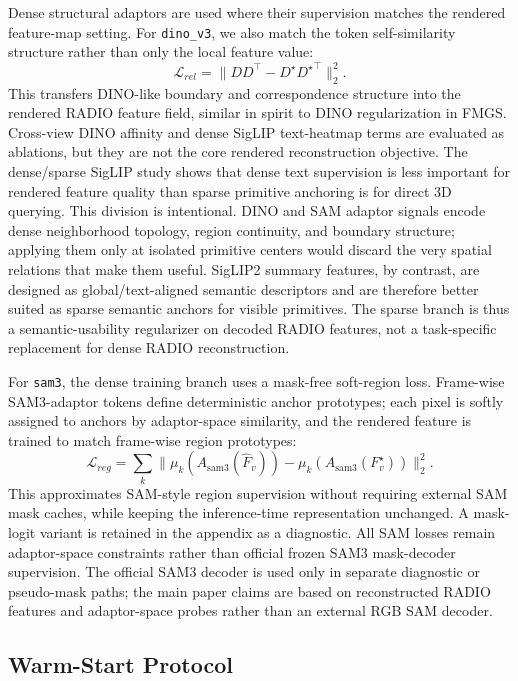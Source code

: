 \documentclass[journal,twoside]{IEEEtran}
\begin{document}
Dense structural adaptors are used where their supervision matches the rendered
feature-map setting. For \texttt{dino\_v3}, we also match the token
self-similarity structure rather than only the local feature value:
\begin{equation}
  \mathcal{L}_{rel}
  =
  \|DD^\top - D^{\star}{D^{\star}}^\top\|_2^2.
\end{equation}
This transfers DINO-like boundary and correspondence structure into the
rendered RADIO feature field, similar in spirit to DINO regularization in
FMGS. Cross-view DINO affinity and dense SigLIP text-heatmap terms are evaluated
as ablations, but they are not the core rendered reconstruction objective. The
dense/sparse SigLIP study shows that dense text supervision is less important
for rendered feature quality than sparse primitive anchoring is for direct 3D
querying.
This division is intentional. DINO and SAM adaptor signals encode dense
neighborhood topology, region continuity, and boundary structure; applying them
only at isolated primitive centers would discard the very spatial relations that
make them useful. SigLIP2 summary features, by contrast, are designed as
global/text-aligned semantic descriptors and are therefore better suited as
sparse semantic anchors for visible primitives. The sparse branch is thus a
semantic-usability regularizer on decoded RADIO features, not a task-specific
replacement for dense RADIO reconstruction.

For \texttt{sam3}, the dense training branch uses a mask-free soft-region loss.
Frame-wise SAM3-adaptor tokens define deterministic anchor prototypes; each
pixel is softly assigned to anchors by adaptor-space similarity, and the
rendered feature is trained to match frame-wise region prototypes:
\begin{equation}
  \mathcal{L}_{reg}
  =
  \sum_k \|\mu_k(A_{\mathrm{sam3}}(\hat{F}_v))
  - \mu_k(A_{\mathrm{sam3}}(F_v^{\star}))\|_2^2.
\end{equation}
This approximates SAM-style region supervision without requiring external SAM
mask caches, while keeping the inference-time representation unchanged. A
mask-logit variant is retained in the appendix as a diagnostic. All SAM losses
remain adaptor-space constraints rather than official frozen SAM3
mask-decoder supervision. The official SAM3 decoder is used only in separate
diagnostic or pseudo-mask paths; the main paper claims are based on
reconstructed RADIO features and adaptor-space probes rather than an external
RGB SAM decoder.

\subsection{Warm-Start Protocol}
\end{document}
